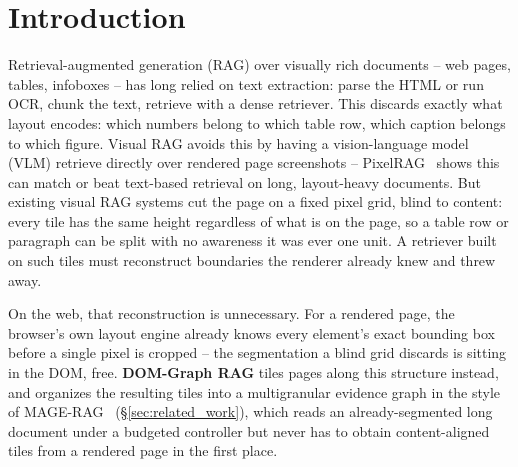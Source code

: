 \section{Introduction}
\label{sec:introduction}

Retrieval-augmented generation (RAG) over visually rich documents -- web pages, tables, infoboxes -- has long relied on text extraction: parse the HTML or run OCR, chunk the text, retrieve with a dense retriever. This discards exactly what layout encodes: which numbers belong to which table row, which caption belongs to which figure. Visual RAG avoids this by having a vision-language model (VLM) retrieve directly over rendered page screenshots -- PixelRAG~\citep{pixelrag2026} shows this can match or beat text-based retrieval on long, layout-heavy documents. But existing visual RAG systems cut the page on a fixed pixel grid, blind to content: every tile has the same height regardless of what is on the page, so a table row or paragraph can be split with no awareness it was ever one unit. A retriever built on such tiles must reconstruct boundaries the renderer already knew and threw away.

On the web, that reconstruction is unnecessary. For a rendered page, the browser's own layout engine already knows every element's exact bounding box before a single pixel is cropped -- the segmentation a blind grid discards is sitting in the DOM, free. \textbf{DOM-Graph RAG} tiles pages along this structure instead, and organizes the resulting tiles into a multigranular evidence graph in the style of MAGE-RAG~\citep{magerag2026} (\S\ref{sec:related_work}), which reads an already-segmented long document under a budgeted controller but never has to obtain content-aligned tiles from a rendered page in the first place.


